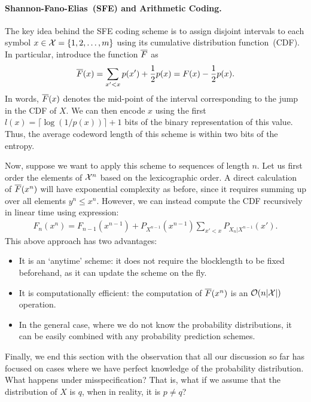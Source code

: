     \paragraph{Shannon-Fano-Elias~(SFE) and Arithmetic Coding.} The key idea behind the SFE coding scheme is to assign disjoint intervals to each symbol $x \in \mathcal{X} = \{1, 2, \ldots, m\}$ using its cumulative distribution function~(CDF). In particular, introduce the function $\overline{F}$ as 
    \begin{align}
        \overline{F}(x) = \sum_{x' < x} p(x') + \frac{1}{2} p(x) = F(x) - \frac{1}{2} p(x). 
    \end{align}
    In words, $\overline{F}(x)$ denotes the mid-point of the interval corresponding to the jump in the CDF of $X$. We can then encode $x$ using the first $l(x) = \lceil \log(1/p(x))\rceil + 1$ bits of the binary representation of this value. Thus, the average codeword length of this scheme is within two bits of the entropy.

    Now, suppose we want to apply this scheme to sequences of length $n$. Let us first order the elements of $\mathcal{X}^n$ based on the lexicographic order. A direct calculation of $\overline{F}(x^n)$ will have exponential complexity as before, since it requires summing up over all elements $y^n \leq x^n$. However, we can instead compute the CDF recursively in linear time using expression: 
    \begin{align}
        F_n(x^n) = F_{n-1}(x^{n-1}) + P_{X^{n-1}}(x^{n-1}) \sum_{x'<x}P_{X_n|X^{n-1}}(x'). 
    \end{align}
    This above approach has two advantages: 
    \begin{itemize}
        \item It is an `anytime' scheme: it does not require the blocklength to be fixed beforehand, as it can update the scheme on the fly.  
        \item It is computationally efficient: the computation of $\overline{F}(x^n)$ is an $\mathcal{O}(n |\mathcal{X}|)$ operation. 
        \item In the general case, where we do not know the probability distributions, it can be easily combined with any probability prediction schemes. 
    \end{itemize}

    Finally, we end this section with the observation that all our discussion so far has focused on cases where we have perfect knowledge of the probability distribution. What happens under misspecification? That is, what if we assume that the distribution of $X$ is $q$, when in reality, it is $p \neq q$? 

